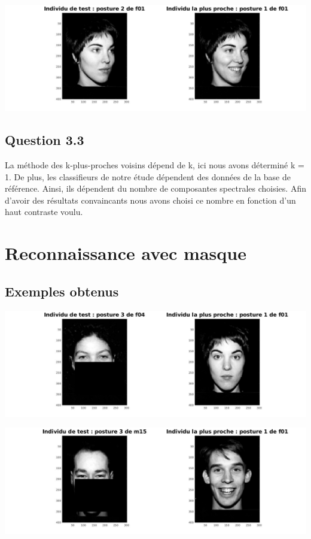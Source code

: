 \documentclass[frenchb]{article}
\begin{document}
		
	\includegraphics[scale=.2]{2.jpg}
	

	\subsection{Question 3.3}
	La méthode des k-plus-proches voisins dépend de k, ici nous avons déterminé k = 1.
	De plus, les classifieurs de notre étude dépendent des données de la base de référence. Ainsi, ils dépendent du nombre de composantes spectrales choisies. Afin d'avoir des résultats convaincants nous avons choisi ce nombre en fonction d'un haut contraste voulu.

	\newpage
	
	\section{Reconnaissance avec masque}
	\subsection{Exemples obtenus}
	\includegraphics[scale=.2]{3.jpg}
		
	\includegraphics[scale=.2]{4.jpg}
	
\end{document}
